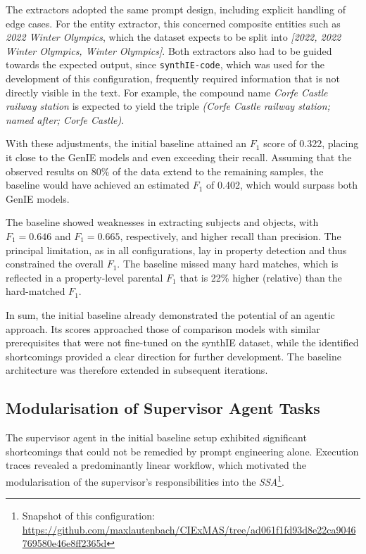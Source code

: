 \documentclass[a4paper,oneside,bibliography=totoc]{scrbook}
\begin{document}
The extractors adopted the same prompt design, including explicit handling of edge cases. For the entity extractor, this concerned composite entities such as \textit{2022 Winter Olympics}, which the dataset expects to be split into \textit{[2022, 2022 Winter Olympics, Winter Olympics]}. Both extractors also had to be guided towards the expected output, since \texttt{synthIE-code}, which was used for the development of this configuration, frequently required information that is not directly visible in the text. For example, the compound name \textit{Corfe Castle railway station} is expected to yield the triple \textit{(Corfe Castle railway station; named after; Corfe Castle)}.

With these adjustments, the initial baseline attained an $F_{1}$ score of 0.322, placing it close to the GenIE models and even exceeding their recall. Assuming that the observed results on 80\% of the data extend to the remaining samples, the baseline would have achieved an estimated $F_{1}$ of 0.402, which would surpass both GenIE models.

The baseline showed weaknesses in extracting subjects and objects, with $F_{1}=0.646$ and $F_{1}=0.665$, respectively, and higher recall than precision. The principal limitation, as in all configurations, lay in property detection and thus constrained the overall $F_{1}$. The baseline missed many hard matches, which is reflected in a property-level parental $F_{1}$ that is 22\% higher (relative) than the hard-matched $F_{1}$.

In sum, the initial baseline already demonstrated the potential of an agentic approach. Its scores approached those of comparison models with similar prerequisites that were not fine-tuned on the synthIE dataset, while the identified shortcomings provided a clear direction for further development. The baseline architecture was therefore extended in subsequent iterations.

\subsection{Modularisation of Supervisor Agent Tasks}
\label{subsec:modularization_agent_tasks}

The supervisor agent in the initial baseline setup exhibited significant shortcomings that could not be remedied by prompt engineering alone. Execution traces revealed a predominantly linear workflow, which motivated the modularisation of the supervisor’s responsibilities into the \textit{\ac{SSA}}\footnote{Snapshot of this configuration: \url{https://github.com/maxlautenbach/CIExMAS/tree/ad061f1fd93d8e22ca9046769580e46e8ff2365d}}.
\end{document}
